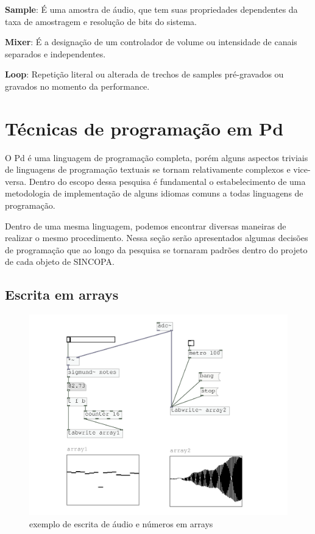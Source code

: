 \documentclass{ppgmus}
\begin{document}
\textbf{Sample}: É uma amostra de áudio, que tem suas propriedades dependentes da
taxa de amostragem e resolução de bits do sistema.


\textbf{Mixer}: É a designação de um controlador de volume ou intensidade de canais separados 
e independentes.

\textbf{Loop}: Repetição literal ou alterada de trechos de samples pré-gravados ou
gravados no momento da performance.

\section{Técnicas de programação em Pd}
\label{tecnicas}


O Pd é uma linguagem de programação completa, porém alguns aspectos triviais
de linguagens de programação textuais se tornam relativamente complexos e vice-versa.
Dentro do escopo dessa pesquisa é fundamental o estabelecimento de uma metodologia de
implementação de alguns idiomas comuns a todas linguagens de programação.

Dentro de uma mesma linguagem, podemos encontrar diversas maneiras
de realizar o mesmo procedimento. Nessa seção serão apresentados algumas decisões de programação 
que ao longo da pesquisa se tornaram padrões dentro do projeto de cada
objeto de SINCOPA.
 
\subsection{Escrita em arrays}

\begin{figure}
\includegraphics[scale=.6]{escrita-array}
\caption{exemplo de escrita de áudio e números em arrays}
\label{escritaarray}
\end{figure}
\end{document}
